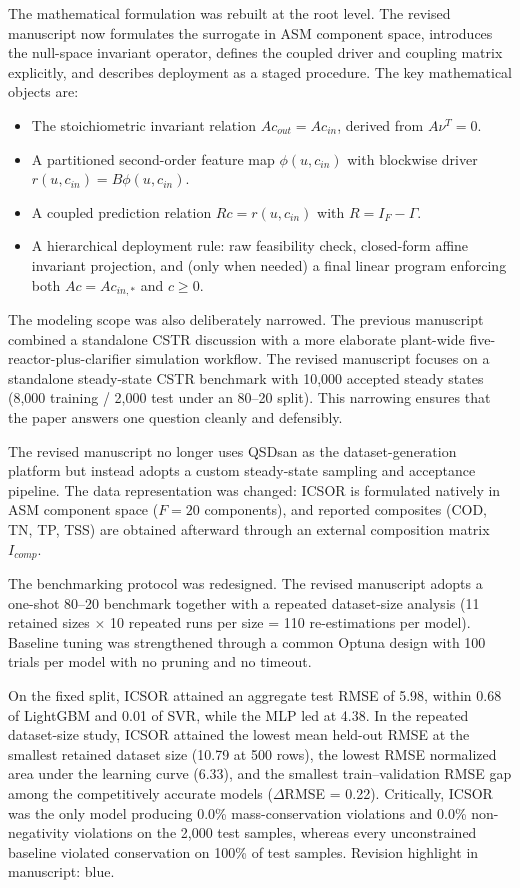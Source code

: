 \documentclass[a4paper,11pt]{article}
\newcommand{\revhighlight}[2]{\textcolor{#1}{Revision highlight in manuscript: #2.}}
\begin{document}
The mathematical formulation was rebuilt at the root level. The revised manuscript now formulates the surrogate in ASM component space, introduces the null-space invariant operator, defines the coupled driver and coupling matrix explicitly, and describes deployment as a staged procedure. The key mathematical objects are:
\begin{itemize}[nosep]
\item The stoichiometric invariant relation $Ac_{out} = Ac_{in}$, derived from $A\nu^T = 0$.
\item A partitioned second-order feature map $\phi(u, c_{in})$ with blockwise driver $r(u, c_{in}) = B\phi(u, c_{in})$.
\item A coupled prediction relation $Rc = r(u, c_{in})$ with $R = I_F - \Gamma$.
\item A hierarchical deployment rule: raw feasibility check, closed-form affine invariant projection, and (only when needed) a final linear program enforcing both $Ac = Ac_{in,*}$ and $c \ge 0$.
\end{itemize}

The modeling scope was also deliberately narrowed. The previous manuscript combined a standalone CSTR discussion with a more elaborate plant-wide five-reactor-plus-clarifier simulation workflow. The revised manuscript focuses on a standalone steady-state CSTR benchmark with 10,000 accepted steady states (8,000 training / 2,000 test under an 80--20 split). This narrowing ensures that the paper answers one question cleanly and defensibly.

The revised manuscript no longer uses QSDsan as the dataset-generation platform but instead adopts a custom steady-state sampling and acceptance pipeline. The data representation was changed: ICSOR is formulated natively in ASM component space ($F = 20$ components), and reported composites (COD, TN, TP, TSS) are obtained afterward through an external composition matrix $I_{comp}$.

The benchmarking protocol was redesigned. The revised manuscript adopts a one-shot 80--20 benchmark together with a repeated dataset-size analysis (11 retained sizes $\times$ 10 repeated runs per size = 110 re-estimations per model). Baseline tuning was strengthened through a common Optuna design with 100 trials per model with no pruning and no timeout.

On the fixed split, ICSOR attained an aggregate test RMSE of 5.98, within 0.68 of LightGBM and 0.01 of SVR, while the MLP led at 4.38. In the repeated dataset-size study, ICSOR attained the lowest mean held-out RMSE at the smallest retained dataset size (10.79 at 500 rows), the lowest RMSE normalized area under the learning curve (6.33), and the smallest train--validation RMSE gap among the competitively accurate models ($\Delta$RMSE = 0.22). Critically, ICSOR was the only model producing 0.0\% mass-conservation violations and 0.0\% non-negativity violations on the 2,000 test samples, whereas every unconstrained baseline violated conservation on 100\% of test samples. \revhighlight{revDefault}{blue}
\end{document}
